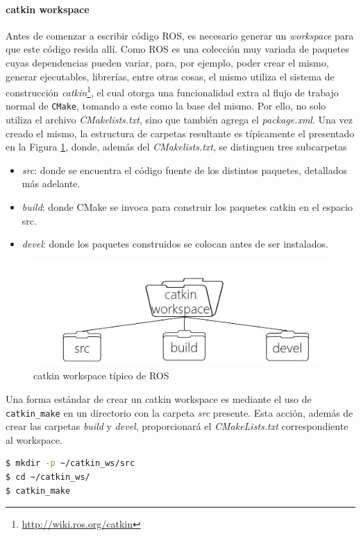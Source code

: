 \paragraph{catkin workspace}
Antes de comenzar a escribir código ROS, es necesario generar un \textit{workspace} para que este código resida allí. Como ROS es una colección muy variada de paquetes cuyas dependencias pueden variar, para, por ejemplo, poder crear el mismo, generar ejecutables, librerías, entre otras cosas, el mismo utiliza el sistema de construcción \textit{catkin}\footnote{\url{http://wiki.ros.org/catkin}}, el cual otorga una funcionalidad extra al flujo de trabajo normal de \texttt{CMake}, tomando a este como la base del mismo. Por ello, no solo utiliza el archivo \textit{CMakelists.txt}, sino que también agrega el \textit{package.xml}. Una vez creado el mismo, la estructura de carpetas resultante es típicamente el presentado en la Figura \ref{fig:catkinworkspace}, donde, además del \textit{CMakelists.txt}, se distinguen tres subcarpetas
\begin{itemize}
    \item \textit{src}: donde se encuentra el código fuente de los distintos paquetes, detallados más adelante.
    \item \textit{build}: donde CMake se invoca para construir los paquetes catkin en el espacio src.
    \item \textit{devel}: donde los paquetes construidos se colocan antes de ser instalados.
\end{itemize}
\begin{figure}[!ht]
    \centering
    \includegraphics[width=\linewidth]{Img/CatkinWorkspace.jpeg}
    \caption{catkin workspace típico de ROS}
    \label{fig:catkinworkspace}
\end{figure}

Una forma estándar de crear un catkin workspace es mediante el uso de \lstinline[language=bash]{catkin_make} en un directorio con la carpeta \textit{src} presente. Esta acción, además de crear las carpetas \textit{build} y \textit{devel}, proporcionará el \textit{CMakeLists.txt} correspondiente al workspace.
\begin{lstlisting}[language=bash]
$ mkdir -p ~/catkin_ws/src
$ cd ~/catkin_ws/
$ catkin_make
\end{lstlisting}

